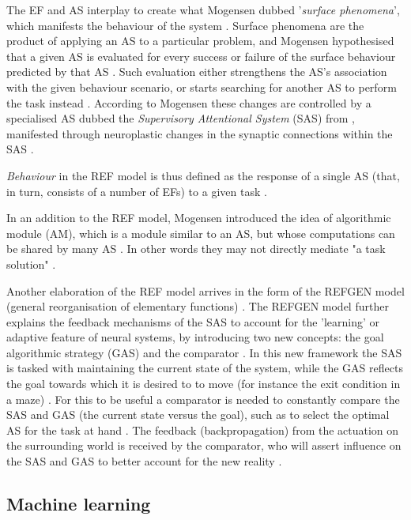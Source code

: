 \documentclass[a4paper,oneside]{memoir}
\begin{document}
The EF and AS interplay to create what Mogensen dubbed '\textit{surface
phenomena}', which manifests the behaviour of the system \autocite{Mogensen2011}.
Surface phenomena are the product of applying an AS to a particular problem,
and Mogensen hypothesised that a given AS is evaluated for every success or
failure of the surface behaviour predicted by that AS \autocite{Mogensen2011}.
Such evaluation either strengthens the AS's association with the given
behaviour scenario, or starts searching for another AS to perform the task
instead \autocite{Mogensen2011}. According to Mogensen these changes
are controlled by a specialised AS dubbed the \textit{Supervisory Attentional
System} (SAS) from \autocite{Norman1986}, manifested through neuroplastic
changes in the synaptic connections within the SAS \autocite{Mogensen2011}.

\textit{Behaviour} in the REF model is thus defined as the response of a single
AS (that, in turn, consists of a number of EFs) to a given task
\autocite{Mogensen2011, Mogensen2012b}.

In an addition to the REF model, Mogensen introduced the idea of algorithmic
module (AM), which is a module similar to an AS, but whose computations can be
shared by many AS \autocite{Mogensen2012b}. In other words they may not
directly mediate "a task solution" \autocite{Mogensen2017}.

Another elaboration of the REF model arrives in the form of the REFGEN
model (general reorganisation of elementary functions) \autocite{Mogensen2017}.
The REFGEN model further explains the feedback mechanisms of the SAS
to account for the 'learning' or adaptive feature of neural systems, by
introducing two new concepts: the goal algorithmic strategy (GAS) and the
comparator \autocite{Mogensen2017, Mogensen2012b}.
In this new framework the SAS is tasked with maintaining the current state
of the system, while the GAS reflects the goal towards which it is desired to
to move (for instance the exit condition in a maze) \autocite{Mogensen2017}.
For this to be useful a comparator is needed to constantly compare the SAS
and GAS (the current state versus the goal), such as to select the optimal AS
for the task at hand \autocite{Mogensen2017}. The feedback (backpropagation)
from the actuation on the surrounding world is received by the comparator,
who will assert influence on the SAS and GAS to better account for the new
reality \autocite{Mogensen2017}.

\subsection{Machine learning}
\end{document}
